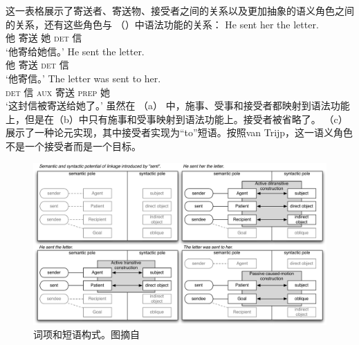 这一表格展示了寄送者、寄送物、接受者之间的关系以及更加抽象的语义角色之间的关系，还有这些角色与 （）中语法功能的关系：
\eal
\ex 
\gll He sent her the letter.\\
     他 寄送 她 \textsc{det} 信\\
\glt `他寄给她信。'
\ex 
\gll He sent the letter.\\
     他 寄送 \textsc{det} 信\\
\glt `他寄信。'
\ex 
\gll The letter was sent to her.\\
      \textsc{det} 信 \textsc{aux} 寄送 \textsc{prep} 她\\
\glt `这封信被寄送给她了。'
\zl
虽然在 （a） 中，施事、受事和接受者都映射到语法功能上，但是在（b）中只有施事和受事映射到语法功能上。接受者被省略了。 （c）展示了一种论元实现，其中接受者实现为“to”短语。按照van Trijp，这一语义角色不是一个接受者而是一个目标。

\begin{figure}
\includegraphics[width=\textwidth]{Figures/2011-van-Trijp.pdf}
\caption{\label{fig-as-trijp}词项和短语构式。图摘自 }
\end{figure}%

